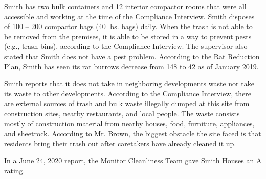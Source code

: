  

Smith has two bulk containers and 12 interior compactor rooms that were all accessible and working at the time of the Compliance Interview. Smith disposes of 100 -- 200 compactor bags (40 lbs. bags) daily. When the trash is not able to be removed from the premises, it is able to be stored in a way to prevent pests (e.g., trash bins), according to the Compliance Interview. The supervisor also stated that Smith does not have a pest problem. According to the Rat Reduction Plan, Smith has seen its rat burrows decrease from 148 to 42 as of January 2019.



Smith reports that it does not take in neighboring developments waste nor take its waste to other developments. According to the Compliance Interview, there are external sources of trash and bulk waste illegally dumped at this site from construction sites, nearby restaurants, and local people. The waste consists mostly of construction material from nearby houses, food, furniture, appliances, and sheetrock. According to Mr. Brown, the biggest obstacle the site faced is that residents bring their trash out after caretakers have already cleaned it up. 

 

In a June 24, 2020 report, the Monitor Cleanliness Team gave Smith Houses an A rating.